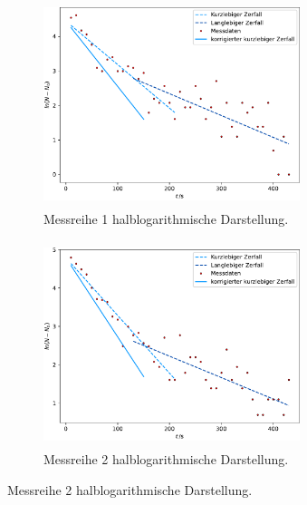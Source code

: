 \begin{figure}[H]
  \centering
  \begin{subfigure}[b]{0.49\textwidth}
      \centering
      \includegraphics[width=7.5cm, height=6cm]{plots/messung1_silber.pdf}
      \caption[]
      {{\small Messreihe 1 halblogarithmische Darstellung.}}    
      \label{fig:silber1exp}
  \end{subfigure}
  \hfill
  \begin{subfigure}[b]{0.49\textwidth}  
      \centering 
      \includegraphics[width=7.5cm, height=6cm]{plots/messung2_silber.pdf}
      \caption[]
      {{\small Messreihe 2 halblogarithmische Darstellung.}}    
      \label{fig:silber2exp}
  \end{subfigure}
\end{figure}


